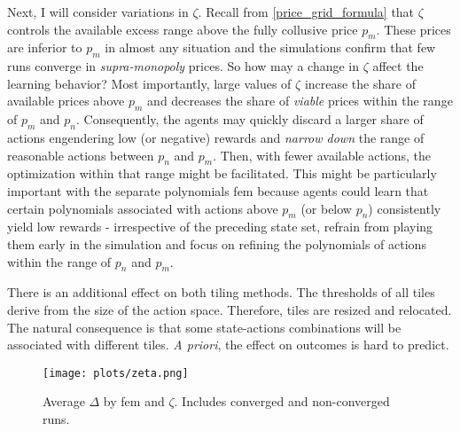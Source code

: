 Next, I will consider variations in $\zeta$. Recall from \autoref{price_grid_formula} that $\zeta$ controls the available excess range above the fully collusive price $p_m$. These prices are inferior to $p_m$ in almost any situation and the simulations confirm that few runs converge in \emph{supra-monopoly} prices. So how may a change in $\zeta$ affect the learning behavior? Most importantly, large values of $\zeta$ increase the share of available prices above $p_m$ and decreases the share of \emph{viable} prices within the range of $p_m$ and $p_n$. Consequently, the agents may quickly discard a larger share of actions engendering low (or negative) rewards and \emph{narrow down} the range of reasonable actions between $p_n$ and $p_m$. Then, with fewer available actions, the optimization within that range might be facilitated. This might be particularly important with the separate polynomials \gls{fem} because agents could learn that certain polynomials associated with actions above $p_m$ (or below $p_n$) consistently yield low rewards - irrespective of the preceding state set, refrain from playing them early in the simulation and focus on refining the polynomials of actions within the range of $p_n$ and $p_m$.

There is an additional effect on both tiling methods. The thresholds of all tiles derive from the size of the action space. Therefore, tiles are resized and relocated. The natural consequence is that some state-actions combinations will be associated with different tiles. \emph{A priori}, the effect on outcomes is hard to predict.

\begin{figure}
	\texttt{[image: plots/zeta.png]}
	\caption[Average $\Delta$ by \gls{fem} and $\zeta$]{Average $\Delta$ by \gls{fem} and $\zeta$. Includes converged and non-converged runs.}
	\label{zeta}
\end{figure}

